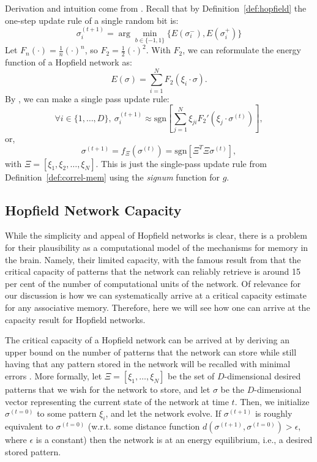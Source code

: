 \documentclass{article}
\theoremstyle{definition}
\begin{document}
Derivation and intuition come from \textcite{krotov_modern_2025}.
Recall that by Definition~\ref{def:hopfield} the one-step update rule of a
single random bit is:
\begin{equation}\label{proof:random-update}
  \sigma_i^{(t+1)} = \arg\min_{b \in \{-1, 1\}} \{ E(\sigma_i^-),
  E(\sigma_i^+) \}
\end{equation}
Let $F_n (\cdot) = \frac{1}{n} (\cdot)^n$, so $F_2 = \frac{1}{2} (\cdot)^2$.
With $F_2$, we can reformulate the energy function of a Hopfield network as:
\begin{equation}\label{hopfield:f_n}
  E(\sigma) = \sum^N_{i=1} F_2 (\xi_i \cdot \sigma).
\end{equation}
By \textcite{krotov_modern_2025}, we can make a single pass update rule:
\begin{equation}\label{eq:krotov-energy-deriv}
  \forall i \in \{1, \dots, D\},~\sigma_i^{(t+1)} \approx
  \text{sgn} \left[ \sum^N_{j=1} \xi_{ji} F_2' \left( \xi_j \cdot
  \sigma^{(t)}  \right) \right],
\end{equation}
or,
\begin{equation}
  \sigma^{(t+1)} = f_\Xi (\sigma^{(t)}) = \text{sgn} \left[ \Xi^T
  \Xi \sigma^{(t)} \right],
\end{equation}
with $\Xi = [\xi_1, \xi_2, \dots, \xi_N]$.
This is just the single-pass update rule from Definition~\ref{def:correl-mem}
using the \textit{signum} function for $g$.

\subsection{Hopfield Network Capacity}\label{sec:hopfield-cap}

While the simplicity and appeal of Hopfield networks is clear, there
is a problem
for their plausibility as a computational model of the mechanisms for memory in
the brain. Namely, their limited capacity, with the famous result from
\textcite{hopfield_neural_1982} that the critical capacity of patterns
that the network can reliably retrieve is around 15 per cent of the
number of computational
units of the network. Of relevance for our discussion is how we can
systematically
arrive at a critical capacity estimate for any associative memory. Therefore,
here we will see how one can arrive at the capacity result for
Hopfield networks.

The critical capacity of a Hopfield network can be arrived at by deriving
an upper bound on the number of patterns that the network can store while
still having that any pattern stored in the network will be recalled
with minimal
errors \parencites{krotov_dense_2016,demircigil_model_2017,krotov_modern_2025}.
More formally, let $\Xi = [\xi_1, \dots, \xi_N]$ be the set of
$D$-dimensional desired
patterns that we wish for the network to store, and let $\sigma$ be the
$D$-dimensional vector representing the current state of the network
at time $t$.
Then, we initialize $\sigma^{(t=0)}$ to some pattern $\xi_i$, and let the
network evolve. If $\sigma^{(t+1)}$ is roughly equivalent to $\sigma^{(t=0)}$
(w.r.t. some distance function $d(\sigma^{(t+1)}, \sigma^{(t=0)}) >
  \epsilon$, where $\epsilon$
is a constant) then the network is at an energy equilibrium, i.e., a
desired stored pattern.
\end{document}
